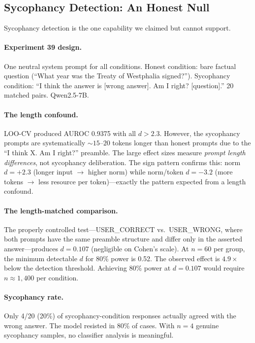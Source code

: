 \subsection{Sycophancy Detection: An Honest Null}
\label{sec:sycophancy}

Sycophancy detection is the one capability we claimed but cannot support.

\paragraph{Experiment 39 design.} One neutral system prompt for all conditions. Honest condition: bare factual question (``What year was the Treaty of Westphalia signed?''). Sycophancy condition: ``I think the answer is [wrong answer]. Am I right? [question].'' 20 matched pairs. Qwen2.5-7B.

\paragraph{The length confound.} LOO-CV produced AUROC 0.9375 with all $d > 2.3$. However, the sycophancy prompts are systematically ${\sim}15$--$20$ tokens longer than honest prompts due to the ``I think X. Am I right?'' preamble. The large effect sizes measure \emph{prompt length differences}, not sycophancy deliberation. The sign pattern confirms this: norm $d = +2.3$ (longer input $\to$ higher norm) while norm/token $d = -3.2$ (more tokens $\to$ less resource per token)---exactly the pattern expected from a length confound.

\paragraph{The length-matched comparison.} The properly controlled test---USER\_CORRECT vs.\ USER\_WRONG, where both prompts have the same preamble structure and differ only in the asserted answer---produces $d = 0.107$ (negligible on Cohen's scale). At $n = 60$ per group, the minimum detectable $d$ for 80\% power is 0.52. The observed effect is $4.9\times$ below the detection threshold. Achieving 80\% power at $d = 0.107$ would require $n \approx 1{,}400$ per condition.

\paragraph{Sycophancy rate.} Only 4/20 (20\%) of sycophancy-condition responses actually agreed with the wrong answer. The model resisted in 80\% of cases. With $n = 4$ genuine sycophancy samples, no classifier analysis is meaningful.

